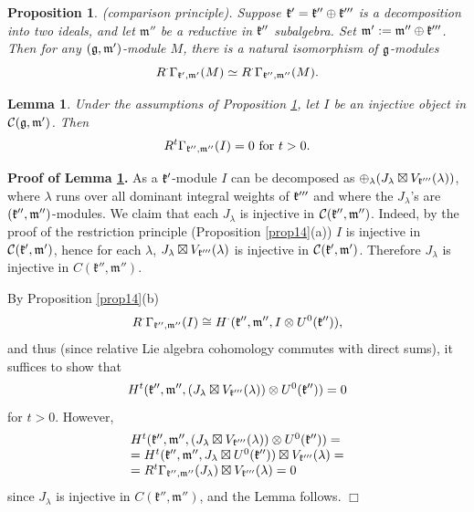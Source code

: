\documentclass[12pt]{article}
\newcounter{theorem}
\newtheorem{lemma}[theo]{Lemma}
\newtheorem{prop}[theo]{Proposition}
\newcommand{\kk}{\mathfrak{k}}
\newcommand{\mm}{\mathfrak{m}}
\newcommand{\refle}[1]{Lemma \ref{#1}}
\newcommand{\refprop}[1]{Proposition \ref{#1}}
\newcommand{\qed}{$\Box$}
\begin{document}
\begin{prop}\label{prop15} (comparison principle).  Suppose $\frak k' = \frak k''\oplus \frak k'''$ is a decomposition into two ideals, and let $\mm''$ be a reductive in $\frak k''$ subalgebra.  Set  $\frak m' := \frak m''\oplus\frak k'''$.  Then for any $(\frak g,\frak m')$-module $M$, there is a natural isomorphism of $\frak g$-modules
\begin{equation}\label{eq2}
R^\cdot\Gamma_{\frak k',\frak m'} (M) \simeq R^\cdot\Gamma_{\frak k'',\frak m''}(M).
\end{equation}
\end{prop}

\begin{lemma}\label{lemma16} Under the assumptions of \refprop{prop15}, let $I$ be an injective object in $\mathcal{C}(\frak g,\frak m')$.  Then
$$
R^t \Gamma_{\frak k'',\frak m''} (I) = 0 \,\, \text{for} \,\, t > 0.
$$
\end{lemma}

\textbf{Proof of \refle{lemma16}.} As a $\frak k'$-module $I$ can be decomposed as $\oplus_\lambda (J_\lambda \boxtimes V_{\frak k'''}(\lambda))$, where $\lambda$ runs over all dominant integral weights of $\frak k'''$ and where the $J_\lambda$'s are $(\frak k'',\frak m'')$-modules.  We claim that each $J_\lambda$ is injective in $\mathcal{C}(\frak k'',\frak m'')$.  Indeed, by the proof of the restriction principle (\refprop{prop14}(a)) $I$ is injective in $\mathcal{C} (\frak k',\frak m')$, hence for each $\lambda$, $J_\lambda\boxtimes V_{\frak k'''} (\lambda)$ is injective in $\mathcal{C}(\frak k', \frak m')$. Therefore $J_\lambda$ is injective in $C(\kk'',\mm'')$.

By \refprop{prop14}(b)
$$
R^\cdot \Gamma_{\frak k'',\frak m''} (I) \cong H^\cdot (\frak k'',\frak m'', I\otimes U^0(\frak k'')),
$$
and thus (since relative Lie algebra cohomology commutes with direct sums), it suffices to show that
\begin{equation}\label{eq03}
H^t(\frak k'',\frak m'', (J_\lambda \boxtimes V_{\frak k'''} (\lambda))\otimes U^0 (\frak k'')) = 0
\end{equation}
for $t > 0$. However,
\begin{equation*}
\begin{array}{l}
H^t (\frak k'',\frak m'', (J_\lambda\boxtimes V_{\frak k'''}(\lambda))\otimes U^0 (\frak k''))= \\
=H^t (\frak k'',\frak m'', J_\lambda\boxtimes U^0({\frak k''}))\boxtimes V_{\kk'''}(\lambda) =\\
=R^t\Gamma_{\kk'',\mm''}(J_\lambda)\boxtimes V_{\kk'''}(\lambda)=0
\end{array}
\end{equation*}
since $J_\lambda$ is injective in $C(\kk'',\mm'')$, and the Lemma follows. \qed
\end{document}
